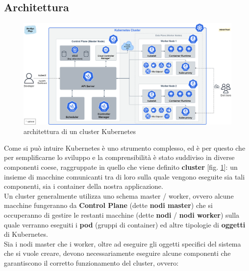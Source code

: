 \subsection{Architettura}
\begin{figure}[ht]
    \centering
    \includegraphics[width=1\linewidth]{UNINA_BSc_Final_Report//img//explanation/kubernetes-cluster-architecture-DevOps.png}
    \caption{architettura di un cluster Kubernetes \cite{k8s-architecture}}
    \label{fig:k8s-architecture}
\end{figure}
Come si può intuire Kubernetes è uno strumento complesso, ed è per questo che per semplificarne lo sviluppo e la comprensibilità è stato suddiviso in diverse componenti coese, raggruppate in quello che viene definito \textbf{cluster} [fig. \ref{fig:k8s-architecture}]: un insieme di macchine comunicanti tra di loro sulla quale vengono eseguite sia tali componenti, sia i container della nostra applicazione.
\\
Un cluster generalmente utilizza uno schema master / worker, ovvero alcune macchine fungeranno da \textbf{Control Plane} (dette \textbf{nodi master}) che si occuperanno di gestire le restanti macchine (dette \textbf{nodi} / \textbf{nodi worker}) sulla quale verranno eseguiti i \textbf{pod} (gruppi di container) ed altre tipologie di \textbf{oggetti} di Kubernetes.
\\
Sia i nodi master che i worker, oltre ad eseguire gli oggetti specifici del sistema che si vuole creare, devono necessariamente eseguire alcune componenti che garantiscono il corretto funzionamento del cluster, ovvero:
